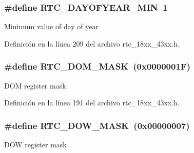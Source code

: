 \subsubsection[{\texorpdfstring{R\+T\+C\+\_\+\+D\+A\+Y\+O\+F\+Y\+E\+A\+R\+\_\+\+M\+IN}{RTC_DAYOFYEAR_MIN}}]{\setlength{\rightskip}{0pt plus 5cm}\#define R\+T\+C\+\_\+\+D\+A\+Y\+O\+F\+Y\+E\+A\+R\+\_\+\+M\+IN~1}\hypertarget{group___r_t_c__18_x_x__43_x_x_ga132dcf308a59affe54749f4f11cd22a6}{}\label{group___r_t_c__18_x_x__43_x_x_ga132dcf308a59affe54749f4f11cd22a6}
Minimum value of day of year 

Definición en la línea 209 del archivo rtc\+\_\+18xx\+\_\+43xx.\+h.

\subsubsection[{\texorpdfstring{R\+T\+C\+\_\+\+D\+O\+M\+\_\+\+M\+A\+SK}{RTC_DOM_MASK}}]{\setlength{\rightskip}{0pt plus 5cm}\#define R\+T\+C\+\_\+\+D\+O\+M\+\_\+\+M\+A\+SK~(0x0000001\+F)}\hypertarget{group___r_t_c__18_x_x__43_x_x_ga7c4ea655a8ccf43870c672c1058a133e}{}\label{group___r_t_c__18_x_x__43_x_x_ga7c4ea655a8ccf43870c672c1058a133e}
D\+OM register mask 

Definición en la línea 191 del archivo rtc\+\_\+18xx\+\_\+43xx.\+h.

\subsubsection[{\texorpdfstring{R\+T\+C\+\_\+\+D\+O\+W\+\_\+\+M\+A\+SK}{RTC_DOW_MASK}}]{\setlength{\rightskip}{0pt plus 5cm}\#define R\+T\+C\+\_\+\+D\+O\+W\+\_\+\+M\+A\+SK~(0x00000007)}\hypertarget{group___r_t_c__18_x_x__43_x_x_ga6564edf565a643214a54ffac364c69ca}{}\label{group___r_t_c__18_x_x__43_x_x_ga6564edf565a643214a54ffac364c69ca}
D\+OW register mask 

